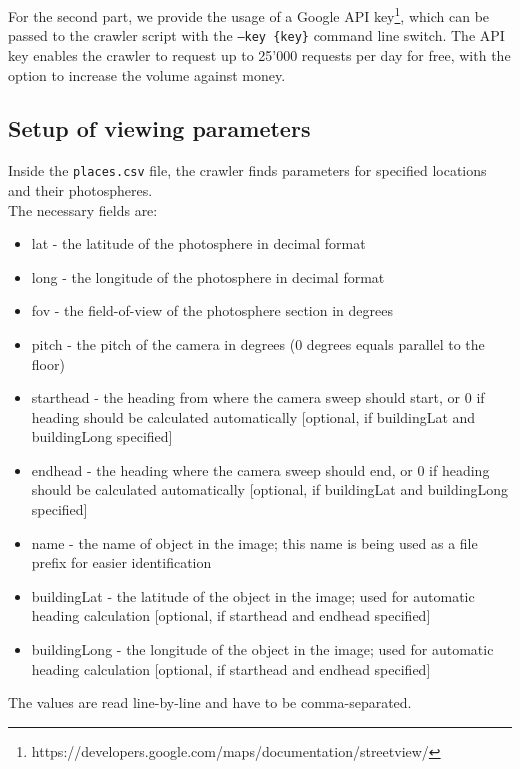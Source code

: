 For the second part, we provide the usage of a Google API key\footnote{https://developers.google.com/maps/documentation/streetview/}, which can be passed to the crawler script with the \texttt{---key \{key\}} command line switch. The API key enables the crawler to request up to 25'000 requests per day for free, with the option to increase the volume against money.

\subsection{Setup of viewing parameters}\label{csv_file}
Inside the \texttt{places.csv} file, the crawler finds parameters for specified locations and their photospheres.\\
The necessary fields are:
\begin{itemize}
    \item{lat - the latitude of the photosphere in decimal format}
    \item{long - the longitude of the photosphere in decimal format}
    \item{fov - the field-of-view of the photosphere section in degrees}
    \item{pitch - the pitch of the camera in degrees (0 degrees equals parallel to the floor)}
    \item{starthead - the heading from where the camera sweep should start, or 0 if heading should be calculated automatically [optional, if buildingLat and buildingLong specified]}
    \item{endhead - the heading where the camera sweep should end, or 0 if heading should be calculated automatically [optional, if buildingLat and buildingLong specified]}
    \item{name - the name of object in the image; this name is being used as a file prefix for easier identification}
    \item{buildingLat - the latitude of the object in the image; used for automatic heading calculation [optional, if starthead and endhead specified]}
    \item{buildingLong - the longitude of the object in the image; used for automatic heading calculation [optional, if starthead and endhead specified]}
\end{itemize}

The values are read line-by-line and have to be comma-separated.

